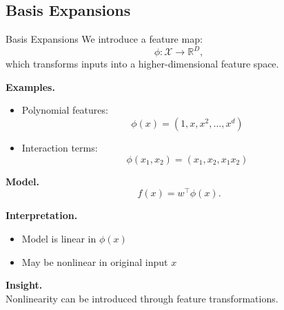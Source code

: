 \documentclass[aspectratio=169,11pt]{beamer}
\begin{document}
\subsection{Basis Expansions}
\begin{frame}[t,allowframebreaks]{Basis Expansions}
\small
We introduce a feature map:
\[
\phi : \mathcal{X} \to \mathbb{R}^D,
\]
which transforms inputs into a higher-dimensional feature space.

\textbf{Examples.}\\ \begin{itemize}
    \item Polynomial features:
    \[
    \phi(x) = (1, x, x^2, \dots, x^d)
    \]

    \item Interaction terms:
    \[
    \phi(x_1, x_2) = (x_1, x_2, x_1 x_2)
    \]
\end{itemize}

\textbf{Model.}\\ \[
f(x) = w^\top \phi(x).
\]

\textbf{Interpretation.}\\ \begin{itemize}
    \item Model is linear in $\phi(x)$
    \item May be nonlinear in original input $x$
\end{itemize}

\textbf{Insight.}\\ Nonlinearity can be introduced through feature transformations.
\end{frame}
\end{document}
